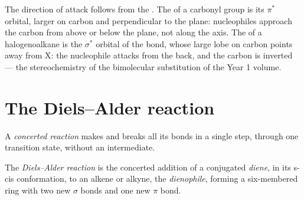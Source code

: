 The direction of attack follows from the . The  of a carbonyl group is its
$\pi^*$ orbital, larger on carbon and perpendicular to the plane: nucleophiles approach
the carbon from above or below the plane, not along the  axis. The  of a
halogenoalkane is the $\sigma^*$ orbital of the  bond, whose large lobe on carbon
points away from X: the nucleophile attacks from the back, and the carbon is inverted
--- the stereochemistry of the bimolecular substitution of the Year 1 volume.

\section{The Diels--Alder reaction}

\begin{definition}\label{def:b2:frontier-orbitals:concerted}
A \emph{concerted reaction} makes and breaks all its bonds in
a single step, through one transition state, without an intermediate.
\end{definition}

\begin{definition}\label{def:b2:frontier-orbitals:diels-alder}
The \emph{Diels--Alder reaction} is the concerted addition
of a conjugated \emph{diene}, in its s-cis conformation, to an alkene or
alkyne, the \emph{dienophile}, forming a six-membered ring with two
new $\sigma$ bonds and one new $\pi$ bond.
\end{definition}

